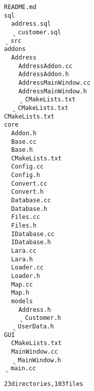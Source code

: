 \documentclass[german,a4paper]{report}
\begin{document}
\begin{alltt}
\textbar\textendash\textendash README.md
\textbar\textendash\textendash sql
\textbar\ \  \textbar\textendash\textendash address.sql
\textbar\ \  \(\llcorner\)\textendash\textendash customer.sql
\(\llcorner\)\textendash\textendash src
    \textbar\textendash\textendash addons
    \textbar\ \  \textbar\textendash\textendash Address
    \textbar\ \  \textbar\ \  \textbar\textendash\textendash AddressAddon.cc
    \textbar\ \  \textbar\ \  \textbar\textendash\textendash AddressAddon.h
    \textbar\ \  \textbar\ \  \textbar\textendash\textendash AddressMainWindow.cc
    \textbar\ \  \textbar\ \  \textbar\textendash\textendash AddressMainWindow.h
    \textbar\ \  \textbar\ \  \(\llcorner\)\textendash\textendash CMakeLists.txt
    \textbar\ \  \(\llcorner\)\textendash\textendash CMakeLists.txt
    \textbar\textendash\textendash CMakeLists.txt
    \textbar\textendash\textendash core
    \textbar\ \  \textbar\textendash\textendash Addon.h
    \textbar\ \  \textbar\textendash\textendash Base.cc
    \textbar\ \  \textbar\textendash\textendash Base.h
    \textbar\ \  \textbar\textendash\textendash CMakeLists.txt
    \textbar\ \  \textbar\textendash\textendash Config.cc
    \textbar\ \  \textbar\textendash\textendash Config.h
    \textbar\ \  \textbar\textendash\textendash Convert.cc
    \textbar\ \  \textbar\textendash\textendash Convert.h
    \textbar\ \  \textbar\textendash\textendash Database.cc
    \textbar\ \  \textbar\textendash\textendash Database.h
    \textbar\ \  \textbar\textendash\textendash Files.cc
    \textbar\ \  \textbar\textendash\textendash Files.h
    \textbar\ \  \textbar\textendash\textendash IDatabase.cc
    \textbar\ \  \textbar\textendash\textendash IDatabase.h
    \textbar\ \  \textbar\textendash\textendash Lara.cc
    \textbar\ \  \textbar\textendash\textendash Lara.h
    \textbar\ \  \textbar\textendash\textendash Loader.cc
    \textbar\ \  \textbar\textendash\textendash Loader.h
    \textbar\ \  \textbar\textendash\textendash Map.cc
    \textbar\ \  \textbar\textendash\textendash Map.h
    \textbar\ \  \textbar\textendash\textendash models
    \textbar\ \  \textbar\ \  \textbar\textendash\textendash Address.h
    \textbar\ \  \textbar\ \  \(\llcorner\)\textendash\textendash Customer.h
    \textbar\ \  \(\llcorner\)\textendash\textendash UserData.h
    \textbar\textendash\textendash GUI
    \textbar\ \  \textbar\textendash\textendash CMakeLists.txt
    \textbar\ \  \textbar\textendash\textendash MainWindow.cc
    \textbar\ \  \(\llcorner\)\textendash\textendash MainWindow.h
    \(\llcorner\)\textendash\textendash main.cc

23 directories, 103 files
\end{alltt}
\end{document}
